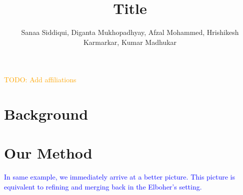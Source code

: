 \documentclass[sigplan,screen,natbib=false]{acmart}
\title{Title}
\author{Sanaa Siddiqui, Diganta Mukhopadhyay, Afzal Mohammed, Hrishikesh
Karmarkar, Kumar Madhukar }
\newcommand{\dmcmt}[1]{\textcolor{blue}{#1}}
\newcommand{\todo}[1]{\textcolor{orange}{TODO: #1}}
\begin{document}
\maketitle
\todo{ Add affiliations}







\section{Background}



\section{Our Method}

\dmcmt{
    In same example, we immediately arrive at a better picture. 
    This picture is equivalent to refining and merging back in the Elboher's
    setting.
} 

\end{document}
